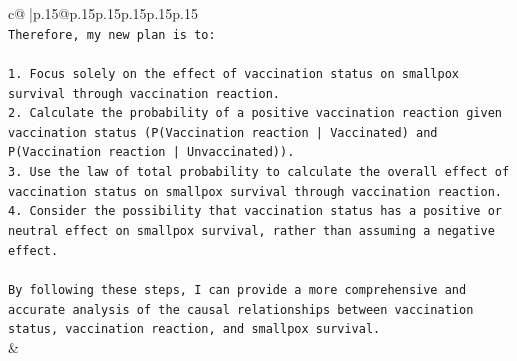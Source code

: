 \documentclass{article}
\begin{document}
{\begin{supertabular}{c@{$\;$}|p{.15\linewidth}@{}p{.15\linewidth}p{.15\linewidth}p{.15\linewidth}p{.15\linewidth}p{.15\linewidth}}
{{{\\ 
\texttt{Therefore, my new plan is to:} \\
\\ 
\texttt{1. Focus solely on the effect of vaccination status on smallpox survival through vaccination reaction.} \\
\texttt{2. Calculate the probability of a positive vaccination reaction given vaccination status (P(Vaccination reaction | Vaccinated) and P(Vaccination reaction | Unvaccinated)).} \\
\texttt{3. Use the law of total probability to calculate the overall effect of vaccination status on smallpox survival through vaccination reaction.} \\
\texttt{4. Consider the possibility that vaccination status has a positive or neutral effect on smallpox survival, rather than assuming a negative effect.} \\
\\ 
\texttt{By following these steps, I can provide a more comprehensive and accurate analysis of the causal relationships between vaccination status, vaccination reaction, and smallpox survival.} \\
            }
        }
    }
    & \\ \\

\end{supertabular}
}
\end{document}
